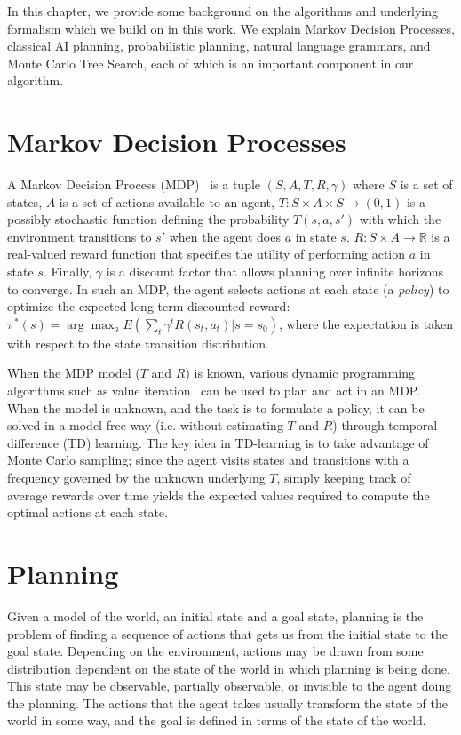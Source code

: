 In this chapter, we provide some background on the algorithms
and underlying formalism which we build on in this work.  We explain
Markov Decision Processes, classical AI planning, probabilistic planning,
natural language grammars, and Monte Carlo Tree Search, each of which
is an important component in our algorithm.

\section{Markov Decision Processes}
A Markov Decision Process (MDP)~\cite{puterman_1994_markov}
is a tuple $(S, A, T, R, \gamma)$ where $S$ is a
set of states, $A$ is a set of actions available to an agent,
$T:S\times A\times S \rightarrow (0,1)$ is a possibly stochastic
function defining the probability $T(s,a,s')$ with which the
environment transitions to $s'$ when the agent does $a$ in state $s$.
$R:S\times A \rightarrow \mathbb{R}$ is a real-valued reward function that
specifies the utility of performing action $a$ in state $s$. Finally,
$\gamma$ is a discount factor that allows planning over infinite
horizons to converge. In such an MDP, the agent selects actions at
each state (a {\em policy}) to optimize the expected long-term
discounted reward: $\pi^*(s)=\arg \max_a E(\sum_t \gamma^t
R(s_t,a_t)|s=s_0)$, where the expectation is taken with respect to the
state transition distribution.

When the MDP model ($T$ and $R$) is
known, various dynamic programming algorithms such as value
iteration~\cite{bellman_1957_dynamic} can be used to plan and act in an MDP. When the
model is unknown, and the task is to formulate a policy, it can be
solved in a model-free way (i.e. without estimating $T$ and $R$)
through temporal difference (TD) learning. The key idea in TD-learning
is to take advantage of Monte Carlo sampling; since the agent visits
states and transitions with a frequency governed by the unknown
underlying $T$, simply keeping track of average rewards over time
yields the expected values required to compute the optimal actions at
each state.


\section{Planning}
Given a model of the world, an initial state and a goal state,
planning is the problem of finding a sequence of actions that gets us 
from the initial state to the goal state.
Depending on the environment, actions may be drawn from some distribution
dependent on the state of the world in which planning is being done.  This
state may be observable, partially observable, or invisible to the agent doing
the planning.  The actions that the agent takes usually transform the state of
the world in some way, and the goal is defined in terms of the state of the
world.

